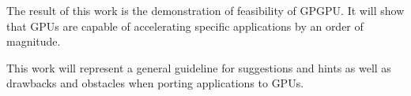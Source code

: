 The result of this work is the demonstration of feasibility of \gls{GPGPU}. It
will show that \glspl{GPU} are capable of accelerating specific applications by
an order of magnitude.

This work will represent a general guideline for suggestions and hints as 
well as drawbacks and obstacles when porting applications to \glspl{GPU}.


\vfill